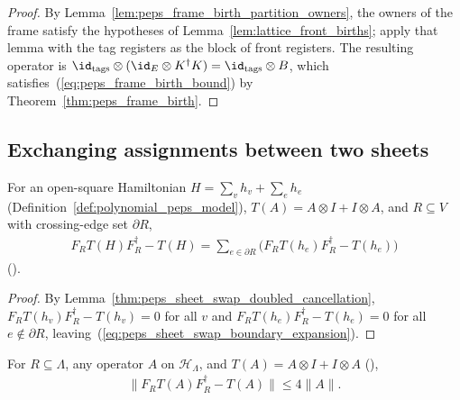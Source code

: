 \begin{proof}\leanok
    By Lemma~\ref{lem:peps_frame_birth_partition_owners}, the owners of the
    frame satisfy the hypotheses of Lemma~\ref{lem:lattice_front_births}; apply
    that lemma with the tag registers as the block of front registers. The
    resulting operator is $\id_{\rm tags}\otimes(\id_E\otimes K^\dagger K)=\id_{\rm tags}\otimes B$,
    which satisfies~(\ref{eq:peps_frame_birth_bound}) by
    Theorem~\ref{thm:peps_frame_birth}.
\end{proof}

\subsection{Exchanging assignments between two sheets}

\begin{lemma}
    \label{thm:peps_sheet_swap_boundary_expansion}
    \leanok
    For an open-square Hamiltonian $H=\sum_v h_v+\sum_e h_e$
    (Definition~\ref{def:polynomial_peps_model}), $T(A)=A\otimes I+I\otimes A$,
    and $R\subseteq V$ with crossing-edge set $\partial R$,
    \begin{align}
        F_RT(H)F_R^\dagger-T(H)
        =\sum_{e\in\partial R}\bigl(F_RT(h_e)F_R^\dagger-T(h_e)\bigr)
        \label{eq:peps_sheet_swap_boundary_expansion}
    \end{align}
    (\cite{OpenAI2026PolynomialPEPS}).
\end{lemma}
\begin{proof}\leanok
    By Lemma~\ref{thm:peps_sheet_swap_doubled_cancellation},
    $F_RT(h_v)F_R^\dagger-T(h_v)=0$ for all $v$ and
    $F_RT(h_e)F_R^\dagger-T(h_e)=0$ for all $e\notin\partial R$, leaving~(\ref{eq:peps_sheet_swap_boundary_expansion}).
\end{proof}

\begin{lemma}
    \label{thm:peps_sheet_swap_doubled_term_norm}
    \leanok
    For $R\subseteq\Lambda$, any operator $A$ on $\mathcal H_\Lambda$, and
    $T(A)=A\otimes I+I\otimes A$ (\cite{OpenAI2026PolynomialPEPS}),
    \begin{align}
        \|F_RT(A)F_R^\dagger-T(A)\|\leq4\|A\|.
        \label{eq:peps_sheet_swap_doubled_term_norm}
    \end{align}
\end{lemma}

